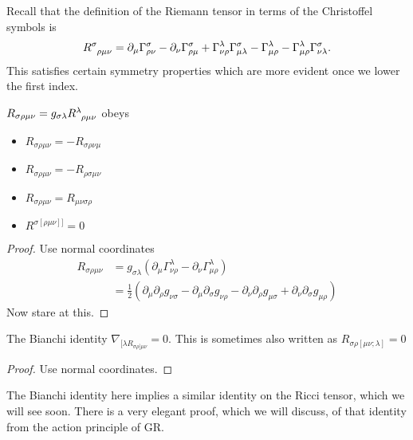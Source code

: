 Recall that the definition of the Riemann tensor in terms of the Christoffel symbols is
\begin{equation}
  R \indices{^{\sigma}_{\rho\mu\nu}} = \partial_{\mu} \Gamma^{\sigma}_{\rho\nu} - \partial_{\nu} \Gamma^{\sigma}_{\rho\mu} + \Gamma^{\lambda}_{\nu\rho} \Gamma^{\sigma}_{\mu\lambda} - \Gamma^{\lambda}_{\mu\rho} - \Gamma^{\lambda}_{\mu\rho} \Gamma^{\sigma}_{\nu\lambda}.
\end{equation}
This satisfies certain symmetry properties which are more evident once we lower the first index.
\begin{claim}
  $R_{\sigma\rho\mu\nu} = g_{\sigma\lambda} R \indices{^{\lambda}_{\rho\mu\nu}}$ obeys
  \begin{itemize}
    \item $R_{\sigma\rho\mu\nu} = -R_{\sigma\rho\nu\mu}$
    \item $R_{\sigma\rho\mu\nu} = - R_{\rho\sigma\mu\nu}$
    \item $R_{\sigma\rho\mu\nu} = R_{\mu\nu\sigma\rho}$
    \item $R^{\sigma[\rho\mu\nu]]} = 0$
  \end{itemize}
\end{claim}
\begin{proof}
  Use normal coordinates
  \begin{align}
    R_{\sigma\rho\mu\nu} &= g_{\sigma\lambda} (\partial_{\mu} \Gamma^{\lambda}_{\nu\rho} -\partial_{\nu} \Gamma^{\lambda}_{\mu\rho}) \\
			 &= \frac{1}{2} (\partial_{\mu} \partial_{\rho} g_{\nu\sigma} - \partial_{\mu} \partial_{\sigma} g_{\nu\rho} - \partial_{\nu} \partial_{\rho} g_{\mu\sigma} + \partial_{\nu} \partial_{\sigma} g_{\mu\rho})
  \end{align}
  Now stare at this.
\end{proof}
\begin{claim}
  The Bianchi identity $\nabla_{[\lambda R_{\sigma\rho] \mu\nu}} = 0$. This is sometimes also written as $R_{\sigma\rho [\mu\nu; \lambda]} = 0$
\end{claim}
\begin{proof}
  Use normal coordinates.
\end{proof}
\begin{leftbar}
  \begin{remark}
    The Bianchi identity here implies a similar identity on the Ricci tensor, which we will see soon. There is a very elegant proof, which we will discuss, of that identity from the action principle of GR.
  \end{remark}
\end{leftbar}
